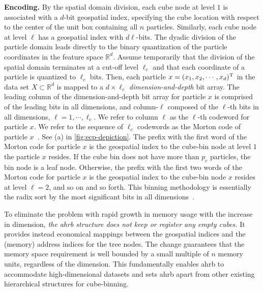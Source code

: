 \documentclass[final]{juliacon}
\begin{document}
\vspace{2pt} {\bf Encoding.} By the spatial domain division, each cube
node at level $1$ is associated with a $d$-bit geospatial index,
specifying the cube location with respect to the center of the unit
box containing all $n$ particles. Similarly, each cube node at level
$\ell$ has a geospatial index with $d\ell$-bits. The dyadic division
of the particle domain leads directly to the binary quantization of
the particle coordinates in the feature space $\mathbb{R}^d$. Assume
temporarily that the division of the spatial domain terminates at a
cut-off level $\ell_c$ and that each coordinate of a particle is
quantized to $\ell_c$ bits. Then, each particle
$x = (x_1,x_2,\cdots, x_d)^{\rm T} $ in the data set
$X \subset \mathbb{R}^{d}$ is mapped to a $d\times \ell_c$ {\em
  dimension-and-depth} bit array.  The leading column of the
dimension-and-depth bit array for particle $x$ is comprised of the
leading bits in all dimensions, and column-$\ell$ composed of the
$\ell$-th bits in all dimensions, $\ell= 1,\cdots, \ell_c$. We refer
to column $\ell$ as the $\ell$-th codeword for particle $x$.  We refer
to the sequence of $\ell_c$ codewords as the Morton code of particle
$x$~\cite{morton1966}. See (a) in \ref{fig:ecp-depiction}.
%
The prefix with the first word of the Morton code for particle $x$ is
the geospatial index to the cube-bin node at level $1$ the particle
$x$ resides. If the cube bin does not have more than $p_c$ particles,
the bin node is a leaf node. Otherwise, the prefix with the first two
words of the Morton code for particle $x$ is the geospatial index to
the cube-bin node $x$ resides at level $\ell=2$, and so on and so
forth. This binning methodology is essentially the radix sort by the
most significant bits in all dimensions~\cite{cormen2022,obeya2019}.


To eliminate the problem with rapid growth in memory usage with the
increase in dimension, {\em the {\sc ahrb} structure does not keep or
  register any empty cubes.}  It provides instead economical mappings
between the geospatial indices and the (memory) address indices for
the tree nodes. The change guarantees that the memory space
requirement is well bounded by a small multiple of $n$ memory units,
regardless of the dimension. This fundamentally enables {\sc ahrb} to
accommodate high-dimensional datasets and sets {\sc ahrb} apart from
other existing hierarchical structures for cube-binning.
%
\end{document}
